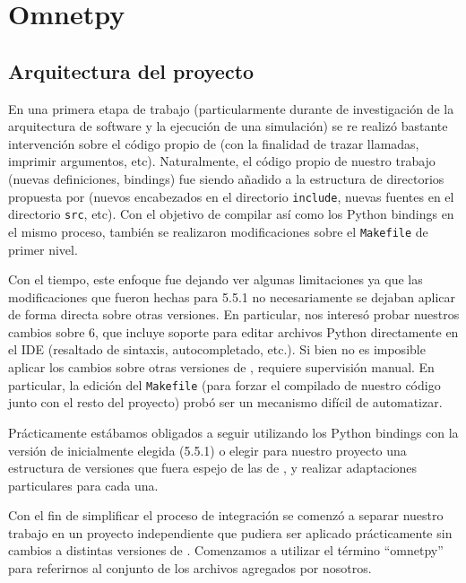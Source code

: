 \chapter{Omnetpy}\label{sec:omnetpy}

\section{Arquitectura del proyecto}

En una primera etapa de trabajo (particularmente durante de investigación de la
arquitectura de software y la ejecución de una simulación) se re realizó
bastante intervención sobre el código propio de \omnetpp{} (con la finalidad de
trazar llamadas, imprimir argumentos, etc). Naturalmente, el código propio de
nuestro trabajo (nuevas definiciones, bindings) fue siendo añadido a la
estructura de directorios propuesta por \omnetpp{} (nuevos encabezados en el
directorio \verb!include!, nuevas fuentes en el directorio \verb!src!, etc).
Con el objetivo de compilar \omnetpp{} así como los Python bindings en el mismo
proceso, también se realizaron modificaciones sobre el \verb!Makefile! de
primer nivel.

Con el tiempo, este enfoque fue dejando ver algunas limitaciones ya que las
modificaciones que fueron hechas para \omnetpp{} 5.5.1 no necesariamente se
dejaban aplicar de forma directa sobre otras versiones. En particular, nos
interesó probar nuestros cambios sobre \omnetpp{} 6, que incluye soporte para
editar archivos Python directamente en el IDE (resaltado de sintaxis,
autocompletado, etc.). Si bien no es imposible aplicar los cambios sobre otras
versiones de \omnetpp{}, requiere supervisión manual. En particular, la edición
del \verb!Makefile! (para forzar el compilado de nuestro código junto con el
resto del proyecto) probó ser un mecanismo difícil de automatizar.

Prácticamente estábamos obligados a seguir utilizando los Python bindings con
la versión de \omnetpp{} inicialmente elegida (5.5.1) o elegir para nuestro
proyecto una estructura de versiones que fuera espejo de las de \omnetpp{}, y
realizar adaptaciones particulares para cada una.

Con el fin de simplificar el proceso de integración se comenzó a separar
nuestro trabajo en un proyecto independiente que pudiera ser aplicado
prácticamente sin cambios a distintas versiones de \omnetpp{}. Comenzamos a
utilizar el término ``omnetpy'' para referirnos al conjunto de los archivos
agregados por nosotros.

